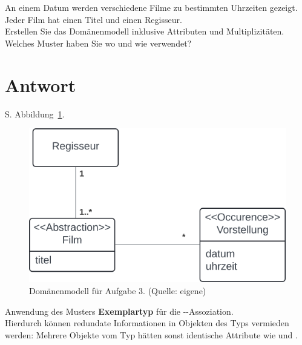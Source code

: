 An einem Datum werden verschiedene Filme zu bestimmten Uhrzeiten gezeigt.
Jeder Film hat einen Titel und einen Regisseur.\\

\noindent
Erstellen Sie das Domänenmodell inklusive Attributen und Multiplizitäten.\\

\noindent
Welches Muster haben Sie wo und wie verwendet?


\section*{Antwort}
S. Abbildung~\ref{fig:film}.

\begin{figure}
    \centering
    \includegraphics[scale=0.4]{chapters/aufgabe 3/img/film}
    \caption{Domänenmodell für Aufgabe 3. (Quelle: eigene)}
    \label{fig:film}
\end{figure}

\noindent
Anwendung des Musters \textbf{Exemplartyp} für die --Assoziation.\\

\noindent
Hierdurch können redundate Informationen in Objekten des Typs  vermieden werden: Mehrere Objekte vom Typ  hätten sonst identische Attribute wie  und .\\


